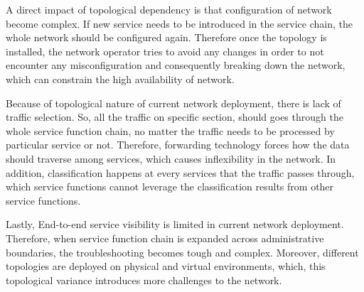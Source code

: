 A direct impact of topological dependency is that configuration of network become complex. If new service needs to be introduced in the service chain, the whole network should be configured again. Therefore once the topology is installed, the network operator tries to avoid any changes in order to not encounter any misconfiguration and consequently breaking down the network, which can constrain the high availability of network.

Because of topological nature of current network deployment, there is lack of traffic selection. So, all the traffic on specific section, should goes through the whole service function chain, no matter the traffic needs to be processed by particular service or not. Therefore, forwarding technology forces how the data should  traverse among services, which causes inflexibility in the network. In addition, classification happens at every services that the traffic passes through, which service functions cannot leverage the classification results from other service functions. 

Lastly, End-to-end service visibility is limited in current network deployment. Therefore, when service function chain is expanded across administrative boundaries, the troubleshooting becomes tough and complex. Moreover, different topologies are deployed on physical and virtual environments, which, this topological variance introduces more challenges to the network.

\clearpage